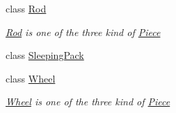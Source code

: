 \begin{DoxyCompactItemize}
class \hyperlink{classgearit_1_1src_1_1robot_1_1_rod}{Rod}
\begin{DoxyCompactList}\small\item\em \hyperlink{classgearit_1_1src_1_1robot_1_1_rod}{Rod} is one of the three kind of \hyperlink{classgearit_1_1src_1_1robot_1_1_piece}{Piece} \end{DoxyCompactList}\item 
class \hyperlink{classgearit_1_1src_1_1robot_1_1_sleeping_pack}{Sleeping\+Pack}
\item 
class \hyperlink{classgearit_1_1src_1_1robot_1_1_wheel}{Wheel}
\begin{DoxyCompactList}\small\item\em \hyperlink{classgearit_1_1src_1_1robot_1_1_wheel}{Wheel} is one of the three kind of \hyperlink{classgearit_1_1src_1_1robot_1_1_piece}{Piece} \end{DoxyCompactList}\end{DoxyCompactItemize}
